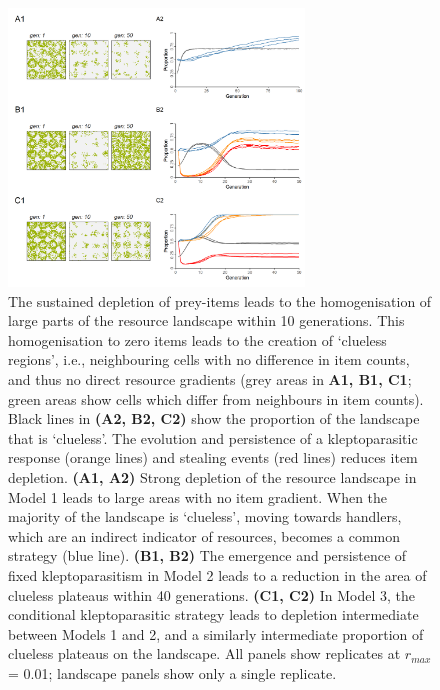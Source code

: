 \documentclass[11pt]{article}
\begin{document}
\begin{figure}[h!]
    \centering
    \includegraphics[width=0.70\textwidth]{figures/fig_08.png}
    \caption{
        The sustained depletion of prey-items leads to the homogenisation of large parts of the resource landscape within 10 generations.
        This homogenisation to zero items leads to the creation of `clueless regions', i.e., neighbouring cells with no difference in item counts, and thus no direct resource gradients (grey areas in \textbf{A1, B1, C1}; green areas show cells which differ from neighbours in item counts).
        Black lines in \textbf{(A2, B2, C2)} show the proportion of the landscape that is `clueless'.
        The evolution and persistence of a kleptoparasitic response (orange lines) and stealing events (red lines) reduces item depletion.
        \textbf{(A1, A2)} Strong depletion of the resource landscape in Model 1 leads to large areas with no item gradient.
        When the majority of the landscape is `clueless', moving towards handlers, which are an indirect indicator of resources, becomes a common strategy (blue line).
        \textbf{(B1, B2)} The emergence and persistence of fixed kleptoparasitism in Model 2 leads to a reduction in the area of clueless plateaus within 40 generations.
        \textbf{(C1, C2)} In Model 3, the conditional kleptoparasitic strategy leads to depletion intermediate between Models 1 and 2, and a similarly intermediate proportion of clueless plateaus on the landscape.
        All panels show replicates at $r_{max}$ = 0.01; landscape panels show only a single replicate.
    }
    \label{Fig:CluelessLandscape}
\end{figure}
\end{document}
